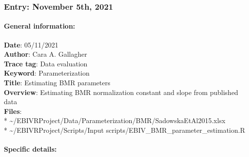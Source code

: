 \documentclass[
]{article}
\begin{document}
\hypertarget{entry-november-5th-2021}{%
\subsubsection{Entry: November 5th,
2021}\label{entry-november-5th-2021}}

\hypertarget{general-information-1}{%
\paragraph{General information:}\label{general-information-1}}

\textbf{Date}: 05/11/2021\\
\textbf{Author}: Cara A. Gallagher\\
\textbf{Trace tag}: Data evaluation\\
\textbf{Keyword}: Parameterization\\
\textbf{Title}: Estimating BMR parameters\\
\textbf{Overview}: Estimating BMR normalization constant and slope from
published data\\
\textbf{Files}:\\
*
\textasciitilde/EBIVRProject/Data/Parameterization/BMR/SadowskaEtAl2015.xlsx\\
* \textasciitilde/EBIVRProject/Scripts/Input
scripts/EBIV\_BMR\_parameter\_estimation.R

\hypertarget{specific-details-1}{%
\paragraph{Specific details:}\label{specific-details-1}}
\end{document}
